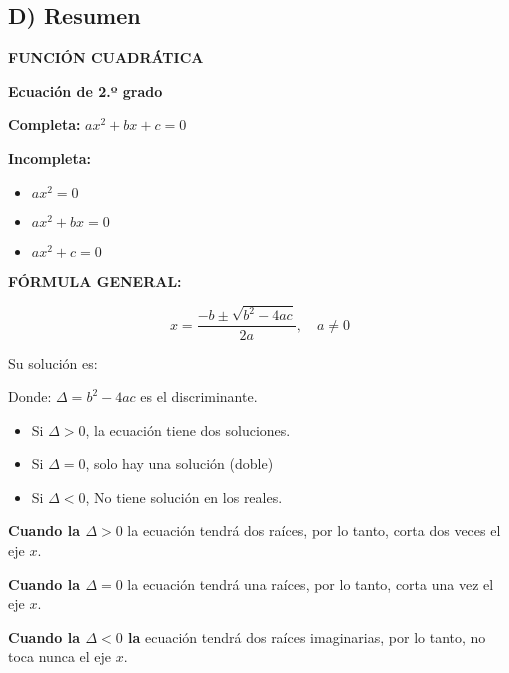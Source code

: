 \documentclass[12pt,a4paper]{article}
\begin{document}
\vspace{5mm}


\subsection*{D) Resumen}

\begin{center}
\textbf{FUNCIÓN CUADRÁTICA}
\end{center}

\begin{tcolorbox}[colback=fondoazul,colframe=azuloscuro]

\textbf{Ecuación de 2.º grado}

\textbf{Completa:} $ax^2 + bx + c = 0$

\textbf{Incompleta:}
\begin{itemize}
\item $ax^2 = 0$
\item $ax^2 + bx = 0$
\item $ax^2 + c = 0$
\end{itemize}

\vspace{0.5cm}

\textbf{FÓRMULA GENERAL:}

$$x = \frac{-b \pm \sqrt{b^2 - 4ac}}{2a}, \quad a \neq 0$$

Su solución es:

Donde: $\Delta = b^2 - 4ac$ es el discriminante.

\begin{itemize}
\item Si $\Delta > 0$, la ecuación tiene dos soluciones.
\item Si $\Delta = 0$, solo hay una solución (doble)
\item Si $\Delta < 0$, No tiene solución en los reales.
\end{itemize}

\vspace{0.5cm}

\textbf{Cuando la $\Delta > 0$} la ecuación tendrá dos raíces, por lo tanto, corta dos veces el eje $x$.

\textbf{Cuando la $\Delta = 0$} la ecuación tendrá una raíces, por lo tanto, corta una vez el eje $x$.

\textbf{Cuando la $\Delta < 0$ la} ecuación tendrá dos raíces imaginarias, por lo tanto, no toca nunca el eje $x$.

\end{tcolorbox}
\end{document}
